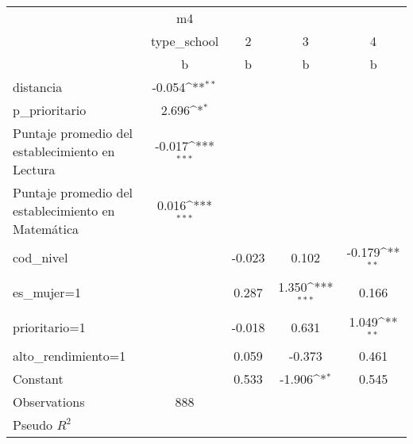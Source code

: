 {
\def\sym#1{\ifmmode^{#1}\else\(^{#1}\)\fi}
\begin{tabular}{l*{4}{c}}
\toprule
                &       m4         &                  &                  &                  \\
                &type\_school         &        2         &        3         &        4         \\
                &        b         &        b         &        b         &        b         \\
\midrule
distancia       &   -0.054\sym{**} &                  &                  &                  \\
p\_prioritario   &    2.696\sym{*}  &                  &                  &                  \\
Puntaje promedio del establecimiento en Lectura&   -0.017\sym{***}&                  &                  &                  \\
Puntaje promedio del establecimiento en Matemática&    0.016\sym{***}&                  &                  &                  \\
cod\_nivel       &                  &   -0.023         &    0.102         &   -0.179\sym{**} \\
es\_mujer=1      &                  &    0.287         &    1.350\sym{***}&    0.166         \\
prioritario=1   &                  &   -0.018         &    0.631         &    1.049\sym{**} \\
alto\_rendimiento=1&                  &    0.059         &   -0.373         &    0.461         \\
Constant        &                  &    0.533         &   -1.906\sym{*}  &    0.545         \\
\midrule
Observations    &      888         &                  &                  &                  \\
Pseudo \(R^{2}\)&                  &                  &                  &                  \\
\bottomrule
\end{tabular}
}
